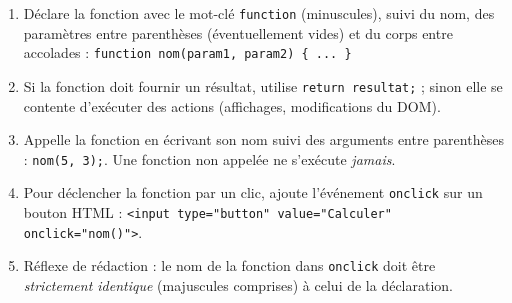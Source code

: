 \documentclass[11pt]{article}
\newcommand{\cle}[1]{{\popxbold\color{popdark}#1}}
\begin{document}
\begin{methode}
\begin{enumerate}
  \item \cle{Déclare} la fonction avec le mot-clé \texttt{function} (minuscules), suivi du nom, des paramètres entre parenthèses (éventuellement vides) et du corps entre accolades :
  \texttt{function nom(param1, param2) \{ ... \}}
  \item Si la fonction doit fournir un résultat, utilise \texttt{return resultat;} ; sinon elle se contente d'exécuter des actions (affichages, modifications du DOM).
  \item \cle{Appelle} la fonction en écrivant son nom suivi des arguments entre parenthèses : \texttt{nom(5, 3);}. Une fonction non appelée ne s'exécute \emph{jamais}.
  \item Pour déclencher la fonction par un clic, ajoute l'\cle{événement} \texttt{onclick} sur un bouton HTML : \texttt{<input type="button" value="Calculer" onclick="nom()">}.
  \item Réflexe de rédaction : le nom de la fonction dans \texttt{onclick} doit être \emph{strictement identique} (majuscules comprises) à celui de la déclaration.
\end{enumerate}
\end{methode}
\end{document}
